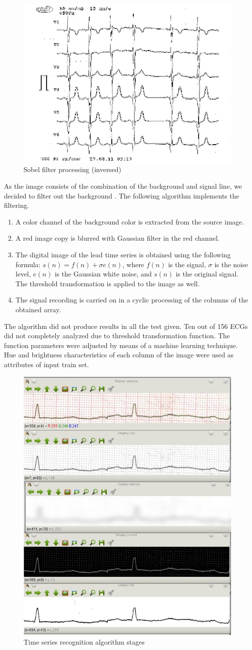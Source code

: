 \documentclass[runningheads]{AIIT}
\newcommand{\nnn}[2][rcolor]{\noindent%
\textcolor{eclr}{}\textcolor{#1}{#2}\textcolor{eclr}{}}
\begin{document}
\begin{figure}[htb]
  \centering
    \includegraphics[width=0.5\linewidth] {images/Sobel.jpg}
  \caption{Sobel filter processing (inversed)}
  \label{fig:sobel-ex}
\end{figure}

As the image consists of the combination of the background and signal line, we decided to filter out the background \cite{1}.  The following algorithm implements the filtering.
\begin{enumerate}
\item A color channel of the background color is extracted from the source image.
\item A red image copy is blurred with Gaussian filter in the red channel.
\item The digital image of the lead time series is obtained using the following formula:
  $s(n)=f(n)+\sigma e(n)$, where $f(n)$ is the signal, $\sigma$ is the
  noise level, $e(n)$ is the Gaussian white noise, and $s(n)$ is the original
  signal.  The threshold transformation is applied to the image as well.
\item The signal recording is carried on in a cyclic processing \nnn{of the columns of the obtained array.}
\end{enumerate}
The algorithm did not produce results in all the test given.  Ten out of 156 ECGs did not completely analyzed due to threshold transformation function.  The function parameters were adjusted by means of a machine learning technique.  Hue and brightness characteristics of each column of the image were used as attributes of input train set.


\begin{figure}[htb]
  \centering
    \includegraphics[width=0.5\linewidth] {images/Algorithm.jpg}
  \caption{Time series recognition algorithm stages}
  \label{fig:leads-ex}
\end{figure}
\end{document}
